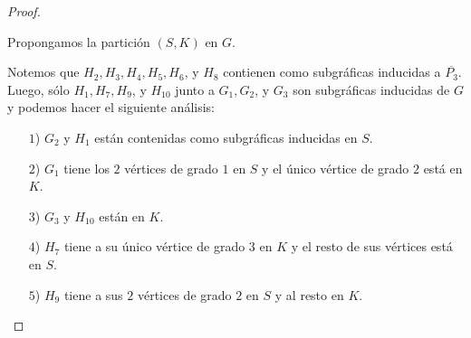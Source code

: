 \documentclass{article}
\begin{document}
\begin{enumerate}
\begin{proof}
\begin{itemize}
\begin{figure}[ht!]
          \end{figure}

          Propongamos la partición $(S, K)$ en $G$.

          Notemos que $H_2, H_3, H_4, H_5, H_6$, y $H_8$ contienen como subgr\'aficas inducidas a
          $\overline{P_3}$. \\
          Luego, s\'olo $H_1, H_7, H_9$, y $H_{10}$ junto a $G_1, G_2$, y $G_3$
          son subgr\'aficas inducidas de $G$ y podemos hacer el siguiente an\'alisis:

          \begin{itemize}
            \item[$1$)] $G_2$ y $H_1$ est\'an contenidas como subgráficas inducidas en $S$.

            \item[$2$)] $G_1$ tiene los $2$ v\'ertices de grado $1$ en $S$ y el \'unico
              v\'ertice de grado $2$ est\'a en $K$.

            \item[$3$)] $G_3$ y $H_{10}$ est\'an en $K$.

            \item[$4$)] $H_7$ tiene a su \'unico v\'ertice de grado $3$ en $K$ y el resto de
              sus v\'ertices est\'a en $S$.

            \item[$5$)] $H_9$ tiene a sus $2$ v\'ertices de grado $2$ en $S$ y al resto en $K$.
          \end{itemize}


\end{itemize}
\end{proof}
\end{enumerate}
\end{document}
